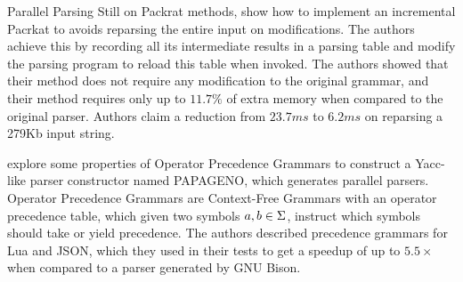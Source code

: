 \begin{section}{Parallel Parsing}
Still on Packrat methods, \cite{dubroy2017incremental} show
how to implement an incremental Pacrkat to avoids reparsing the entire input
on modifications. The authors achieve this by recording all its
intermediate results in a parsing table and modify the parsing program to reload
this table when invoked. The authors showed that their method does not require
any modification to the original grammar, and their method requires only
up to $11.7\%$ of extra memory when compared to the original parser. Authors
claim a reduction from $23.7ms$ to $6.2ms$ on reparsing a 279Kb input string.

\cite{Barenghi:2015:PPM:2839536.2840146} explore some properties of Operator
Precedence Grammars to construct a Yacc-like parser constructor named PAPAGENO,
which generates parallel parsers. Operator Precedence Grammars are Context-Free
Grammars with an operator precedence table, which given two symbols $a, b \in
\Sigma$, instruct which symbols should take or yield precedence. The authors
described precedence grammars for Lua and JSON, which they used in their tests
to get a speedup of up to $5.5\times$ when compared to a parser generated by
GNU Bison.

\end{section}


